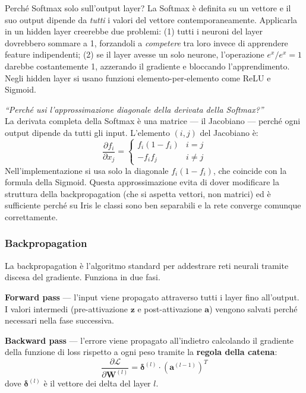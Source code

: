 \documentclass[12pt, a4paper]{article}
\begin{document}
\begin{concetto}{Perché Softmax solo sull'output layer?}
La Softmax è definita su un vettore e il suo output dipende da \emph{tutti}
i valori del vettore contemporaneamente. Applicarla in un hidden layer
creerebbe due problemi: (1) tutti i neuroni del layer dovrebbero sommare a 1,
forzandoli a \emph{competere} tra loro invece di apprendere feature
indipendenti; (2) se il layer avesse un solo neurone, l'operazione
$e^{x}/e^{x} = 1$ darebbe costantemente 1, azzerando il gradiente e
bloccando l'apprendimento. Negli hidden layer si usano funzioni
elemento-per-elemento come ReLU e Sigmoid.
\end{concetto}

\begin{domanda}
\textit{``Perché usi l'approssimazione diagonale della derivata della Softmax?''}\\
La derivata completa della Softmax è una matrice --- il Jacobiano --- perché
ogni output dipende da tutti gli input. L'elemento $(i,j)$ del Jacobiano è:
\[
    \frac{\partial f_i}{\partial x_j} =
    \begin{cases} f_i(1-f_i) & i=j \\ -f_i f_j & i \neq j \end{cases}
\]
Nell'implementazione si usa solo la diagonale $f_i(1-f_i)$, che coincide con
la formula della Sigmoid. Questa approssimazione evita di dover modificare
la struttura della backpropagation (che si aspetta vettori, non matrici) ed
è sufficiente perché su Iris le classi sono ben separabili e la rete
converge comunque correttamente.
\end{domanda}

\subsubsection{Backpropagation}

La backpropagation è l'algoritmo standard per addestrare reti neurali tramite
discesa del gradiente. Funziona in due fasi.

\vspace{0.2cm}
\noindent\textbf{Forward pass} --- l'input viene propagato attraverso tutti
i layer fino all'output. I valori intermedi (pre-attivazione $\mathbf{z}$ e
post-attivazione $\mathbf{a}$) vengono salvati perché necessari nella fase
successiva.

\vspace{0.2cm}
\noindent\textbf{Backward pass} --- l'errore viene propagato all'indietro
calcolando il gradiente della funzione di loss rispetto a ogni peso tramite
la \textbf{regola della catena}:
\begin{equation}
    \frac{\partial \mathcal{L}}{\partial \mathbf{W}^{(l)}} =
    \boldsymbol{\delta}^{(l)} \cdot \left(\mathbf{a}^{(l-1)}\right)^T
\end{equation}
dove $\boldsymbol{\delta}^{(l)}$ è il vettore dei delta del layer $l$.
\end{document}
